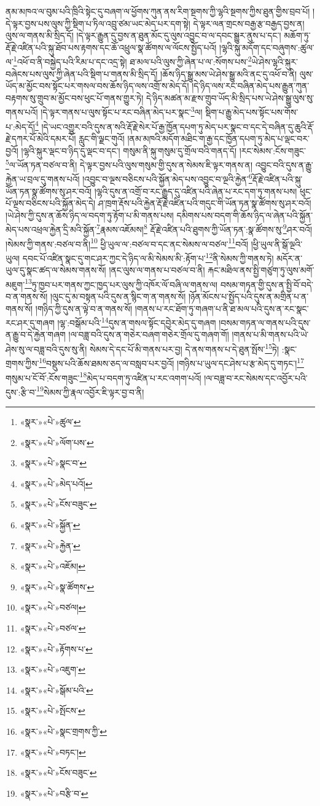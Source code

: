 ནམ་མཁའ་ལ་བུམ་པའི་ཁྲིའི་སྟེང་དུ་བཞག་ལ་ཕྱོགས་ཀུན་ནས་རིག་སྔགས་ཀྱི་ལྷའི་སྔགས་ཀྱིས་ཐུན་གྱིས་བྲབ་པོ། །དེ་ལྟར་བྱས་པས་ལུས་ཀྱི་སྡིག་པ་ཏིལ་འབྲུ་ཙམ་ཡང་མེད་པར་དག་སྟེ། དེ་ལྟར་ལན་གྲངས་བརྒྱ་རྩ་བརྒྱད་བྱས་ན། ལུས་ལ་གནས་མི་སྲིད་དོ། །དེ་ལྟར་རྒྱུན་དུ་བྱས་ན་ཐུན་མོང་དུ་ལུས་འབྱུང་བ་ལ་དབང་སྒྱུར་ནུས་པ་དང་། མཆོག་ཏུ་རྡོ་རྗེ་འཛིན་པའི་སྐུ་ཐོབ་པས་རྟགས་དང་ཆོ་འཕྲུལ་སྣ་ཚོགས་ལ་ལོངས་སྤྱོད་པའོ། །ལྷའི་སྐུ་མདོག་དང་བཞུགས་:ཚུལ་ལ་\footnote{«སྣར་»«པེ་»ཚུལ་}འཕོ་བ་ནི་བསྐྱེད་པའི་རིམ་པ་དང་འདྲ་སྟེ། ཐ་མལ་པའི་ལུས་ཀྱི་ཞེན་པ་ལ་:སོགས་པས་\footnote{«སྣར་»«པེ་»ལོག་པས་}ཡེ་ཤེས་ལྷའི་སྐུར་བཞེངས་པས་ལུས་ཀྱི་ཞེན་པའི་སྡིག་པ་གནས་མི་སྲིད་དོ། །ཆོས་ཉིད་སྒྱུ་མས་ཡེ་ཤེས་སྒྱུ་མའི་ནང་དུ་འཕོ་བ་ནི། ལུས་ཡོད་མ་མྱོང་བས་སྟོང་པར་གསལ་བས་ཆོས་ཉིད་ལས་འགྲོ་ས་མེད་དོ། །དེ་ཉིད་ལས་རང་བཞིན་མེད་པས་རྒྱུན་ཀུན་བརྟགས་སུ་གྲུབ་མ་མྱོང་བས་ཕུང་པོ་གནས་གྱུར་ཏེ། དེ་ཉིད་མཚན་མ་རྫས་གྲུབ་ཡོད་མི་སྲིད་པས་ཡེ་ཤེས་སྒྱུ་ལུས་སུ་གནས་པའོ། །དེ་ལྟར་གནས་པ་ལུས་སྟོང་པ་རང་བཞིན་མེད་པར་སྣང་\footnote{«སྣར་»«པེ་»སྣང་བ་}ལ། སྡིག་པ་རྒྱུ་མེད་པས་སྟོང་པས་གོས་པ་:མེད་དོ།\footnote{«སྣར་»«པེ་»མེད་པའོ།} །དེ་ཡང་འགྱུར་བའི་དུས་ན་སའི་རྡོ་རྗེ་སེར་པོ་རྒྱ་ཁྱོན་དཔག་ཏུ་མེད་པར་སྣང་བ་དང་དེ་བཞིན་དུ་ཆུའི་རྡོ་རྗེ་དཀར་པོ་མེའི་དམར་པོ། རླུང་གི་ལྗང་གུའོ། །ནམ་མཁའི་མདོག་མཐིང་ག་རྒྱ་དང་ཁྱོན་དཔག་ཏུ་མེད་པ་ལྡང་བར་བྱའོ། །ལྷའི་སྐུར་ལྡང་བ་ཉིད་དུ་ལྡང་བ་དང་། གསུམ་ནི་སྐུ་གསུམ་དུ་གྲོལ་བའི་གནད་དོ། །རང་སེམས་:ངོས་གཟུང་\footnote{«སྣར་»«པེ་»ངོས་བཟུང་}ལ་ཡོན་ཏན་བཙལ་བ་ནི། དེ་ལྟར་བྱས་པའི་ལུས་གསུམ་གྱི་དུས་ན་སེམས་ཇི་ལྟར་གནས་ན། འབྱུང་བའི་དུས་ན་རྒྱུ་རྐྱེན་ཡ་བྲལ་དུ་གནས་པའོ། །འབྱུང་བ་ལྔས་བཅིངས་པའི་སྐྱོན་མེད་པས་འབྱུང་བ་ལྔའི་རྐྱེན་\footnote{«སྣར་»«པེ་»སྐྱོན་}རྡོ་རྗེ་འཛིན་པའི་སྐུ་ཡོན་ཏན་སྣ་ཚོགས་སུ་ཤར་བའོ། །ལྷའི་དུས་ན་འགྲོ་བ་རང་རྒྱུད་དུ་འཛིན་པའི་ཞེན་པ་རང་དག་ཏུ་གནས་པས། ཕུང་པོ་ལྔས་བཅིངས་པའི་སྐྱོན་མེད་དེ། ཤ་ཁྲག་རྡོས་པའི་རྐྱེན་རྡོ་རྗེ་འཛིན་པའི་གདུང་གི་ཡོན་ཏན་སྣ་ཚོགས་སུ་ཤར་བའོ། །ཡེ་ཤེས་ཀྱི་དུས་ན་ཆོས་ཉིད་ལ་བདག་ཏུ་རྟོག་པ་མི་གནས་པས། དམིགས་པས་བདག་གི་ཆོས་ཉིད་ལ་ཞེན་པའི་སྐྱོན་མེད་པས་འཕྲལ་རྐྱེན་དྲི་མའི་སྐྱོན་\footnote{«སྣར་»«པེ་»རྐྱེན་}རྣམས་འཇོམས།\footnote{«སྣར་»«པེ་»འཇོམ།} རྡོ་རྗེ་འཛིན་པའི་ཐུགས་ཀྱི་ཡོན་ཏན་:སྣ་ཚོགས་སུ་\footnote{«སྣར་»«པེ་»སྣ་ཚོགས་}ཤར་བའོ། །སེམས་ཀྱི་གནས་:བཙལ་བ་ནི།\footnote{«སྣར་»«པེ་»བཙལ།} ཕྱི་ཡུལ་ལ་:བཙལ་བ་དང་ནང་སེམས་ལ་བཙལ་\footnote{«སྣར་»«པེ་»བཙལ་}བའོ། །ཕྱི་ཡུལ་ནི་སྒོ་ལྔའི་ཡུལ། དབང་པོ་འཛིན་སྣང་དུ་གང་ཤར་ཀྱང་དེ་ཉིད་ལ་མི་སེམས་མི་:རྟོག་པ་\footnote{«སྣར་»«པེ་»རྟོགས་པ་}ནི་སེམས་ཀྱི་གནས་ཏེ། མདོར་ན་ཡུལ་དུ་སྣང་ཚད་ལ་སེམས་གནས་སོ། །ནང་ལུས་ལ་གནས་པ་བཙལ་བ་ནི། རྐང་མཐིལ་ནས་སྤྱི་གཙུག་ཏུ་ལུས་མགོ་མཇུག་\footnote{«སྣར་»«པེ་»འཇུག་}ཏུ་ཁྱབ་པར་གནས་ཀྱང་ཁྱད་པར་ལུས་ཀྱི་འཁོར་ལོ་བཞི་ལ་གནས་ལ། བསམ་གཏན་གྱི་དུས་ན་སྤྱི་བོ་བདེ་བ་ན་གནས་སོ། །ལུང་དུ་མ་བསྟན་པའི་དུས་ན་སྙིང་ག་ན་གནས་སོ། །ཉོན་མོངས་པ་སྤྱོད་པའི་དུས་ན་མགྲིན་པ་ན་གནས་སོ། །གཉིད་ཀྱི་དུས་ན་ལྟེ་བ་ན་གནས་སོ། །གནས་པ་རང་ཐོག་ཏུ་གཞག་པ་ནི་ཐ་མལ་པའི་དུས་ན་རང་སྣང་རང་ཤར་དུ་གཞག །ལྷ་:བསྒོམ་པའི་\footnote{«སྣར་»«པེ་»སྒོམ་པའི་}དུས་ན་གསལ་སྟོང་དབྱེར་མེད་དུ་གཞག །བསམ་གཏན་ལ་གནས་པའི་དུས་ན་རྒྱུ་བ་དེ་རྐྱེན་གཞག །ལ་བཟླ་བའི་དུས་ན་གཅེར་བཞག་གཅེར་གྲོལ་དུ་གཞག་གོ། །གནས་པ་མི་གནས་པའི་ཡེ་ཤེས་སུ་ལ་བཟླ་བའི་དུས་སུ་ནི། སེམས་དེ་དང་པོ་མི་གནས་པར་བྱ། དེ་ནས་གནས་པ་དེ་ཐུན་སྤོས་\footnote{«སྣར་»«པེ་»སྤོངས་}ཏེ། :སྣང་གྲགས་ཀྱིས་\footnote{«སྣར་»«པེ་»སྣང་གྲགས་ཀྱི་}བསྡུས་པའི་ཆོས་ཐམས་ཅད་ལ་བསླབ་པར་བྱའོ། །གཉིས་པ་ཡུལ་དང་ཤེས་པ་རྩ་མེད་དུ་གཏང་།\footnote{«སྣར་»«པེ་»བཏང་།} གསུམ་པ་ངོ་བོ་:ངོས་གཟུང་\footnote{«སྣར་»«པེ་»ངོས་བཟུང་}མེད་པ་བདག་ཏུ་འཛིན་པ་རང་འགག་པའོ། །ལ་བཟླ་བ་རང་སེམས་དང་འབྱོར་པའི་དུས་:རྩི་བ་\footnote{«སྣར་»«པེ་»བརྩི་བ་}སེམས་ཀྱི་རྣལ་འབྱོར་ཇི་ལྟར་བྱ་བ་ནི། 